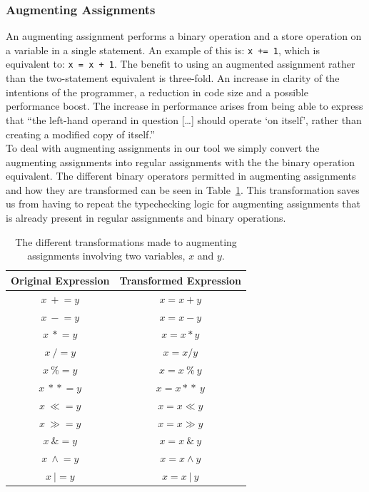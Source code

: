 \documentclass[12pt, titlepage]{article}
\begin{document}
\subsubsection{Augmenting Assignments}
An augmenting assignment performs a binary operation and a store operation on a variable in a single statement. An example of this is: \texttt{x += 1}, which is equivalent to: \texttt{x = x + 1}. The benefit to using an augmented assignment rather than the two-statement equivalent is three-fold. An increase in clarity of the intentions of the programmer, a reduction in code size and a possible performance boost. The increase in performance arises from being able to express that ``the left-hand operand in question [\ldots] should operate `on itself', rather than creating a modified copy of itself.''~\cite{pepAugAssign} \\
\indent To deal with augmenting assignments in our tool we simply convert the augmenting assignments into regular assignments with the the binary operation equivalent. The different binary operators permitted in augmenting assignments and how they are transformed can be seen in Table~\ref{table:augAssign}. This transformation saves us from having to repeat the typechecking logic for augmenting assignments that is already present in regular assignments and binary operations.

	\begin{table}
	\centering
    \begin{tabular}{ | c | c |}
    \hline
    \textbf{Original Expression} & \textbf{Transformed Expression}  \\ \hline
    $x \: +\!= y$ & $x = x + y$   \\ \hline
    $x \: -\!= y$ & $x = x - y$   \\ \hline
    $x \: *\!= y$ & $x = x * y$   \\ \hline
    $x \: /\!= y$ & $x = x / y$   \\ \hline
    $x \: \%\!= y$ & $x = x \: \% \: y$   \\ \hline
    $x \: *\!*\!= y$ & $x = x *\!* \: y$   \\ \hline
    $x \: \ll = y$ & $x = x \ll y$   \\ \hline
    $x \: \gg = y$ & $x = x \gg y$   \\ \hline
    $x \: \&\!= y$ & $x = x \: \& \: y$   \\ \hline
    $x \: \wedge\!= y$ & $x = x \wedge y$   \\ \hline
    $x \: |= y$ & $x = x \: | \: y$   \\ \hline
    \end{tabular}
    \caption{The different transformations made to augmenting assignments involving two variables, $x$ and $y$.}
	\label{table:augAssign}
    \end{table}
\end{document}
